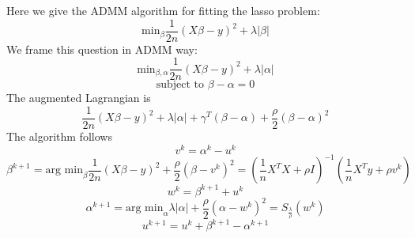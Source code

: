 \documentclass{article}
\begin{document}
Here we give the ADMM algorithm for fitting the lasso problem:
\[
\textrm{min}_\beta \frac{1}{2n}(X\beta-y)^2+\lambda|\beta| 
\]
We frame this question in ADMM way:
\[
\textrm{min}_{\beta,\alpha}\frac{1}{2n}(X\beta-y)^2+\lambda|\alpha|
\]
\[
\textrm{subject to    } \beta-\alpha=0
\]
The augmented Lagrangian is
\[
\frac{1}{2n}(X\beta-y)^2+\lambda|\alpha|+\gamma^T(\beta-\alpha)+\frac{\rho}{2}(\beta-\alpha)^2
\]
The algorithm follows
\[
v^k=\alpha^k-u^k
\]
\[
\beta^{k+1}=\textrm{arg min}_\beta \frac{1}{2n}(X\beta-y)^2+\frac{\rho}{2}(\beta-v^k)^2=(\frac{1}{n}X^TX+\rho I)^{-1}(\frac{1}{n}X^Ty+\rho v^k)
\]
\[
w^k=\beta^{k+1}+u^k
\]
\[
\alpha^{k+1}=\textrm{arg min}_\alpha \lambda|\alpha|+\frac{\rho}{2}(\alpha-w^k)^2=S_{\frac{\lambda}{\rho}}(w^k)
\]
\[
u^{k+1}=u^k+\beta^{k+1}-\alpha^{k+1}
\]
\end{document}
